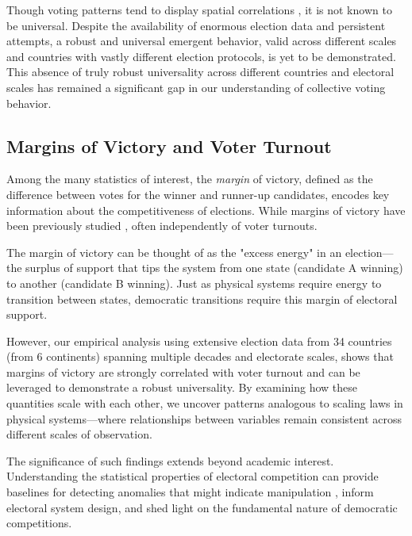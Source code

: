 Though voting patterns tend to display spatial correlations \cite{FerSucRam2014, BraDeA2017,MicIlkAtt2021,MorHisNak2019}, it is not known to be universal. Despite the availability of enormous election data and persistent attempts, a robust and universal emergent behavior, valid across different scales and countries with vastly different election protocols, is yet to be demonstrated. This absence of truly robust universality across different countries and electoral scales has remained a significant gap in our understanding of collective voting behavior.

\subsection{Margins of Victory and Voter Turnout}
Among the many statistics of interest, the \emph{margin} of victory, defined as the difference between votes for the winner and runner-up candidates, encodes key information about the competitiveness of elections. While margins of victory have been previously studied \cite{jacobson1987marginals, mccrane1997threatening, mulligan2003empirical, magrino2011computing, xia2012computing, bhattacharyya2021predicting}, often independently of voter turnouts. 

The margin of victory can be thought of as the "excess energy" in an election—the surplus of support that tips the system from one state (candidate A winning) to another (candidate B winning). Just as physical systems require energy to transition between states, democratic transitions require this margin of electoral support.

However, our empirical analysis using extensive election data \cite{india_data, clea, canada_data, DVN/VOQCHQ_2018} from 34 countries (from 6 continents) spanning multiple decades and electorate scales, shows that margins of victory are strongly correlated with voter turnout and can be leveraged to demonstrate a robust universality. By examining how these quantities scale with each other, we uncover patterns analogous to scaling laws in physical systems—where relationships between variables remain consistent across different scales of observation.

The significance of such findings extends beyond academic interest. Understanding the statistical properties of electoral competition can provide baselines for detecting anomalies that might indicate manipulation \cite{statistical-detection-of-systematic-election-irregularities, testing-for-voter-rigging-in-small-polling-stations, klimek2012statistical, jimenez2017testing, brigaldino2011elections, belarus2012parliamentary, belarusian2019parliamentary, belarus2020presidential}, inform electoral system design, and shed light on the fundamental nature of democratic competitions.


